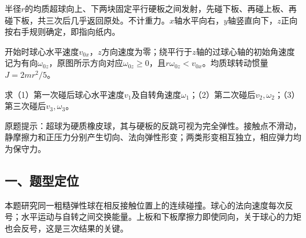 \documentclass[12pt,a4paper,fontset=fandol]{ctexart}
\begin{document}
半径\(r\)的均质超球向上、下两块固定平行硬板之间发射，先碰下板、再碰上板、再碰下板，共三次后几乎返回原处。不计重力。\(x\)轴水平向右，\(y\)轴竖直向下，\(z\)正向按右手规则确定，即指向纸内。

开始时球心水平速度\(v_{0x}\)，\(z\)方向速度为零；绕平行于\(z\)轴的过球心轴的初始角速度记为有向\(\omega_{0z}\)，原图所示方向对应\(\omega_{0z}\geq0\)，且\(r\omega_{0z}<v_{0x}\)。均质球转动惯量\(J=2mr^2/5\)。

\begin{center}
\begin{minipage}{\linewidth}
\centering\begingroup{}
\ifdim\wd\diagrambox>.88\linewidth
\sbox{\diagrambox}{\resizebox{.88\linewidth}{!}{\usebox{\diagrambox}}}\fi
\ifdim\ht\diagrambox>.38\textheight
\resizebox{!}{.38\textheight}{\usebox{\diagrambox}}
\else\usebox{\diagrambox}\fi
\par{}\endgroup\end{minipage}\end{center}

求（1）第一次碰后球心水平速度\(v_1\)及自转角速度\(\omega_1\)；（2）第二次碰后\(v_2,\omega_2\)；（3）第三次碰后\(v_3,\omega_3\)。

原题提示：超球为硬质橡皮球，其与硬板的反跳可视为完全弹性。接触点不滑动，静摩擦力和正压力分别产生切向、法向弹性形变；两类形变相互独立，相应弹力均为保守力。

\subsection{一、题型定位}\label{ux4e00ux9898ux578bux5b9aux4f4d-2}

本题研究同一粗糙弹性球在相反接触位置上的连续碰撞。球心的法向速度每次反号；水平运动与自转之间交换能量。上板和下板摩擦力即使同向，关于球心的力矩也会反号，这是三次结果的关键。
\end{document}
